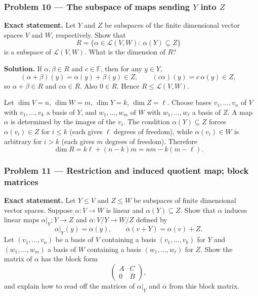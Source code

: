 \documentclass[12pt,a4paper]{article}
\theoremstyle{plain}
\theoremstyle{definition}      %
\begin{document}
\subsubsection*{Problem 10 — The subspace of maps sending $Y$ into $Z$}

\textbf{Exact statement.}
Let $Y$ and $Z$ be subspaces of the finite dimensional vector spaces $V$ and $W$, respectively.
Show that
\[
R=\{\alpha\in \mathcal L(V,W):\ \alpha(Y)\subseteq Z\}
\]
is a subspace of $\mathcal L(V,W)$. What is the dimension of $R$?

\textbf{Solution.}
If $\alpha,\beta\in R$ and $c\in\mathbb F$, then for any $y\in Y$,
\[
(\alpha+\beta)(y)=\alpha(y)+\beta(y)\in Z,\qquad (c\alpha)(y)=c\,\alpha(y)\in Z,
\]
so $\alpha+\beta\in R$ and $c\alpha\in R$. Also $0\in R$. Hence $R\le \mathcal L(V,W)$.

Let $\dim V=n$, $\dim W=m$, $\dim Y=k$, $\dim Z=\ell$.
Choose bases $v_1,\dots,v_n$ of $V$ with $v_1,\dots,v_k$ a basis of $Y$, and $w_1,\dots,w_m$ of $W$ with
$w_1,\dots,w_\ell$ a basis of $Z$.
A map $\alpha$ is determined by the images of the $v_i$.
The condition $\alpha(Y)\subseteq Z$ forces $\alpha(v_i)\in Z$ for $i\le k$ (each gives $\ell$ degrees of freedom),
while $\alpha(v_i)\in W$ is arbitrary for $i>k$ (each gives $m$ degrees of freedom).
Therefore
\[
\dim R=k\ell+(n-k)m=nm-k(m-\ell).
\]

\bigskip

\subsubsection*{Problem 11 — Restriction and induced quotient map; block matrices}

\textbf{Exact statement.}
Let $Y\le V$ and $Z\le W$ be subspaces of finite dimensional vector spaces.
Suppose $\alpha:V\to W$ is linear and $\alpha(Y)\subseteq Z$.
Show that $\alpha$ induces linear maps $\alpha|_Y:Y\to Z$ and
$\overline{\alpha}:V/Y\to W/Z$ defined by
\[
\alpha|_Y(y)=\alpha(y),\qquad \overline{\alpha}(v+Y)=\alpha(v)+Z.
\]
Let $(v_1,\dots,v_n)$ be a basis of $V$ containing a basis $(v_1,\dots,v_k)$ for $Y$ and
$(w_1,\dots,w_m)$ a basis of $W$ containing a basis $(w_1,\dots,w_\ell)$ for $Z$.
Show the matrix of $\alpha$ has the block form
\[
\begin{pmatrix}
	A & C\\
	0 & B
\end{pmatrix},
\]
and explain how to read off the matrices of $\alpha|_Y$ and $\overline{\alpha}$ from this block matrix.
\end{document}
